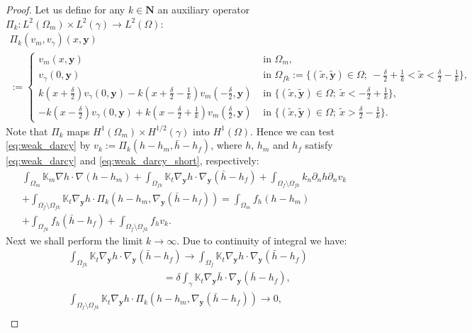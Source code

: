 \documentclass[a4paper]{article}
\def\vc#1{\mathbf{\boldsymbol{#1}}}     %
\def\tn#1{{\mathbb{#1}}}    %
\def\Natural{\mathbf N}
\def\yy{{\vc y}}
\begin{document}
\begin{proof}
Let us define for any $k\in\Natural$ an auxiliary operator $\Pi_k:L^2(\Omega_m)\times L^2(\gamma)\to L^2(\Omega)$:
\begin{multline*}
\Pi_k(v_m,v_\gamma)(x,\vc y)\\ :=
\begin{cases}
v_m(x,\vc y) & \mbox{ in }\Omega_m,\\
v_\gamma(0,\vc y) & \mbox{ in }\Omega_{fk}:=\{(\tilde x,\tilde{\vc y})\in\Omega;~-\frac\delta2+\frac1k<\tilde x<\frac\delta2-\frac1k\},\\
k(x+\frac\delta2)v_\gamma(0,\vc y) - k(x+\frac\delta2-\frac1k)v_m(-\frac\delta2,\vc y) & \mbox{ in }\{(\tilde x,\tilde{\vc y})\in\Omega;~\tilde x<-\frac\delta2+\frac1k\},\\
-k(x-\frac\delta2)v_\gamma(0,\vc y) + k(x-\frac\delta2+\frac1k)v_m(\frac\delta2,\vc y) & \mbox{ in }\{(\tilde x,\tilde{\vc y})\in\Omega;~\tilde x>\frac\delta2-\frac1k\}.
\end{cases}
\end{multline*}
Note that $\Pi_k$ maps $H^1(\Omega_m)\times H^{1/2}(\gamma)$ into $H^1(\Omega)$.
Hence we can test \eqref{eq:weak_darcy} by $v_k:=\Pi_k(h-h_m,\bar h-h_f)$, where $h$, $h_m$ and $h_f$ satisfy \eqref{eq:weak_darcy} and \eqref{eq:weak_darcy_short}, respectively:
\begin{multline}
\label{eq:global_vk}
\int_{\Omega_m}\tn K_m\nabla h\cdot\nabla(h-h_m)
+\int_{\Omega_{fk}}\tn K_t\nabla_\yy h\cdot\nabla_\yy(\bar h-h_f)
+\int_{\Omega_f\setminus\Omega_{fk}} k_n\partial_n h \partial_n v_k\\
+ \int_{\Omega_f\setminus\Omega_{fk}} \tn K_t\nabla_\yy h \cdot \Pi_k(h-h_m,\nabla_\yy(\bar h-h_f))
= \int_{\Omega_m} f_h (h-h_m)\\
+ \int_{\Omega_{fk}} f_h (\bar h-h_f)
+ \int_{\Omega_f\setminus\Omega_{fk}} f_h v_k.
\end{multline}
Next we shall perform the limit $k\to\infty$.
Due to continuity of integral we have:
\begin{align}
&\int_{\Omega_{fk}}\tn K_t\nabla_\yy h\cdot\nabla_\yy(\bar h-h_f) \to \int_{\Omega_f}\tn K_t\nabla_\yy h\cdot\nabla_\yy(\bar h-h_f)\\
&\hspace{4cm} = \delta\int_\gamma\tn K_t\nabla_\yy\bar h\cdot\nabla_\yy(\bar h-h_f),\\
&\int_{\Omega_f\setminus\Omega_{fk}} \tn K_t\nabla_\yy h \cdot \Pi_k(h-h_m,\nabla_\yy(\bar h-h_f)) \to 0, \\

\end{align}
\end{proof}
\end{document}
